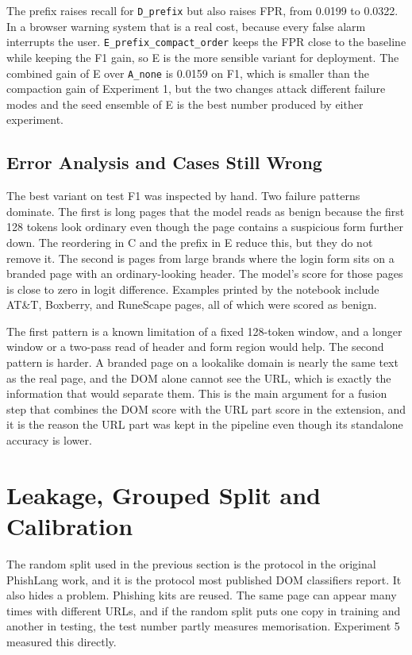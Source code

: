 \documentclass{FastFyp}
\begin{document}
The prefix raises recall for \texttt{D\_prefix} but also raises FPR, from 0.0199 to 0.0322. In a browser warning system that is a real cost, because every false alarm interrupts the user. \texttt{E\_prefix\_compact\_order} keeps the FPR close to the baseline while keeping the F1 gain, so E is the more sensible variant for deployment. The combined gain of E over \texttt{A\_none} is 0.0159 on F1, which is smaller than the compaction gain of Experiment 1, but the two changes attack different failure modes and the seed ensemble of E is the best number produced by either experiment.

\subsection{Error Analysis and Cases Still Wrong}
\label{subsec:dom-errors}

The best variant on test F1 was inspected by hand. Two failure patterns dominate. The first is long pages that the model reads as benign because the first 128 tokens look ordinary even though the page contains a suspicious form further down. The reordering in C and the prefix in E reduce this, but they do not remove it. The second is pages from large brands where the login form sits on a branded page with an ordinary-looking header. The model's score for those pages is close to zero in logit difference. Examples printed by the notebook include AT\&T, Boxberry, and RuneScape pages, all of which were scored as benign.

The first pattern is a known limitation of a fixed 128-token window, and a longer window or a two-pass read of header and form region would help. The second pattern is harder. A branded page on a lookalike domain is nearly the same text as the real page, and the DOM alone cannot see the URL, which is exactly the information that would separate them. This is the main argument for a fusion step that combines the DOM score with the URL part score in the extension, and it is the reason the URL part was kept in the pipeline even though its standalone accuracy is lower.

\section{Leakage, Grouped Split and Calibration}
\label{sec:leakage}

The random split used in the previous section is the protocol in the original PhishLang work, and it is the protocol most published DOM classifiers report. It also hides a problem. Phishing kits are reused. The same page can appear many times with different URLs, and if the random split puts one copy in training and another in testing, the test number partly measures memorisation. Experiment 5 measured this directly.
\end{document}
